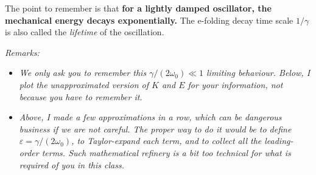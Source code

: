 \documentclass[11pt]{article}
\providecommand{\tightlist}{%
      \setlength{\itemsep}{0pt}\setlength{\parskip}{0pt}}
\begin{document}
    The point to remember is that \textbf{for a lightly damped oscillator,
the mechanical energy decays exponentially.} The e-folding decay time
scale \(1/\gamma\) is also called the \emph{lifetime} of the
oscillation.

    \emph{Remarks:}

\begin{itemize}
\tightlist
\item
  \emph{We only ask you to remember this \(\gamma/(2\omega_0) \ll 1\)
  limiting behaviour. Below, I plot the unapproximated version of \(K\)
  and \(E\) for your information, not because you have to remember it.}
\item
  \emph{Above, I made a few approximations in a row, which can be
  dangerous business if we are not careful. The proper way to do it
  would be to define \(\varepsilon = \gamma/(2\omega_0)\), to
  Taylor-expand each term, and to collect all the leading-order terms.
  Such mathematical refinery is a bit too technical for what is required
  of you in this class.}
\end{itemize}
\end{document}

